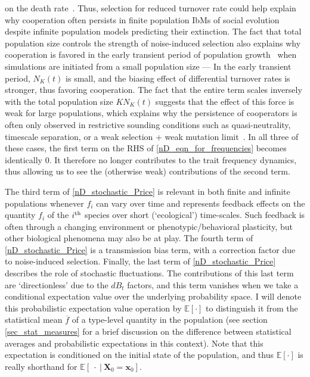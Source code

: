on the death rate~\citep{mcleod_social_2019}. Thus, selection for reduced turnover rate could help explain why cooperation often persists in finite population IbMs of social evolution~\citep{houchmandzadeh_selection_2012,houchmandzadeh_fluctuation_2015,chotibut_evolutionary_2015,behar_fluctuations-induced_2016,mcleod_social_2019} despite infinite population models predicting their extinction. The fact that total population size controls the strength of noise-induced selection also explains why cooperation is favored in the early transient period of population growth~\citep{melbinger_evolutionary_2010} when simulations are initiated from a small population size --- In the early transient period, $N_K(t)$ is small, and the biasing effect of differential turnover rates is stronger, thus favoring cooperation. The fact that the entire term scales inversely with the total population size $KN_K(t)$ suggests that the effect of this force is weak for large populations, which explains why the persistence of cooperators is often only observed in restrictive sounding conditions such as quasi-neutrality, timescale separation, or a weak selection + weak mutation limit~\citep{mcleod_social_2019}. In all three of these cases, the first term on the RHS of \eqref{nD_eqn_for_frequencies} becomes identically 0. It therefore no longer contributes to the trait frequency dynamics, thus allowing us to see the (otherwise weak) contributions of the second term.

The third term of \eqref{nD_stochastic_Price} is relevant in both finite and infinite populations whenever $f_i$ can vary over time and represents feedback effects on the quantity $f_i$ of the $i\textsuperscript{th}$ species over short (`ecological') time-scales. Such feedback is often through a changing environment or phenotypic/behavioral plasticity, but other biological phenomena may also be at play. The fourth term of \eqref{nD_stochastic_Price} is a transmission bias term, with a correction factor due to noise-induced selection. Finally, the last term of \eqref{nD_stochastic_Price} describes the role of stochastic fluctuations. The contributions of this last term are `directionless' due to the $dB_t$ factors, and this term vanishes when we take a conditional expectation value over the underlying probability space. I will denote this probabilistic expectation value operation by $\mathbb{E}[\cdot]$ to distinguish it from the statistical mean $\overline{f}$ of a type-level quantity in the population (see section \ref{sec_stat_measures} for a brief discussion on the difference between statistical averages and probabilistic expectations in this context). Note that this expectation is conditioned on the initial state of the population, and thus $\mathbb{E}[\cdot]$ is really shorthand for $\mathbb{E}[\ \cdot \ | \ \mathbf{X}_0 = \mathbf{x}_0]$.

